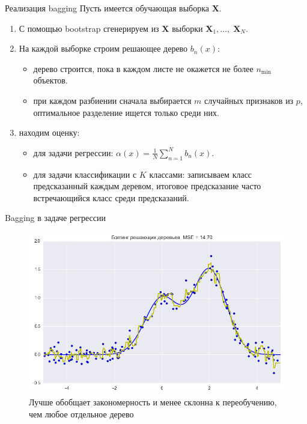 \documentclass[notheorems, handout]{beamer}
\begin{document}
\begin{frame}{Реализация bagging}
Пусть имеется обучающая выборка $\mathbf{X}$.
\begin{enumerate}
	\item С помощью bootstrap сгенерируем из $\mathbf{X}$ выборки $\mathbf{X}_{1}, \dots,\; \mathbf{X}_{N}$.
	\item На каждой выборке строим решающее дерево $b_{n}(x)$:
		\begin{itemize}
			\item дерево строится, пока в каждом листе не окажется не более $n_{\min}$ объектов.
			\item при каждом разбиении сначала выбирается $m$ случайных признаков из $p$, оптимальное разделение ищется только среди них.
		\end{itemize}
	\item находим оценку:
		\begin{itemize}
			\item для задачи регрессии: $\alpha(x) = \frac{1}{N}\displaystyle\sum_{n = 1}^{N} b_{n}(x)$.
			\item для задачи классификации с $K$ классами: записываем класс предсказанный каждым деревом, итоговое предсказание часто встречающийся класс среди предсказаний.
		\end{itemize}
\end{enumerate}
\end{frame}

\begin{frame}{Bagging в задаче регрессии}
\begin{figure}[h!]
  \includegraphics[width=1 \textwidth]{img/bagging_re}
 \caption{Лучше обобщает закономерность и менее склонна к переобучению, чем любое отдельное дерево}
\end{figure}
\end{frame}
\end{document}
